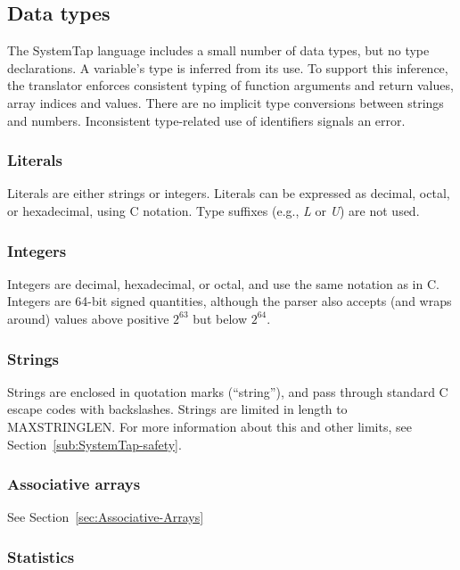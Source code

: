 \documentclass[twoside,english]{article}
\begin{document}
\subsection{Data types\label{sub:Data-types}}
The SystemTap language includes a small number of data types, but no type
declarations. A variable's type is inferred from its use.
To support this inference, the translator enforces consistent typing of function
arguments and return values, array indices and values. There are no implicit
type conversions between strings and numbers. Inconsistent type-related use
of identifiers signals an error.


\subsubsection{Literals}
Literals are either strings or integers. Literals can be expressed as decimal,
octal, or hexadecimal, using C notation. Type suffixes (e.g., \emph{L} or
\emph{U}) are not used. 


\subsubsection{Integers\label{sub:Integers}}
 
Integers are decimal, hexadecimal, or octal, and use the same notation as
in C. Integers are 64-bit signed quantities, although the parser also accepts
(and wraps around) values above positive $2^{63}$ but below $2^{64}$.


\subsubsection{Strings\label{sub:Strings}}
Strings are enclosed in quotation marks ({}``string''), and pass through
standard C escape codes with backslashes. Strings are limited in length to
MAXSTRINGLEN. For more information about this and other limits, see Section~\ref{sub:SystemTap-safety}.


\subsubsection{Associative arrays}

See Section~\ref{sec:Associative-Arrays}


\subsubsection{Statistics}
\end{document}
